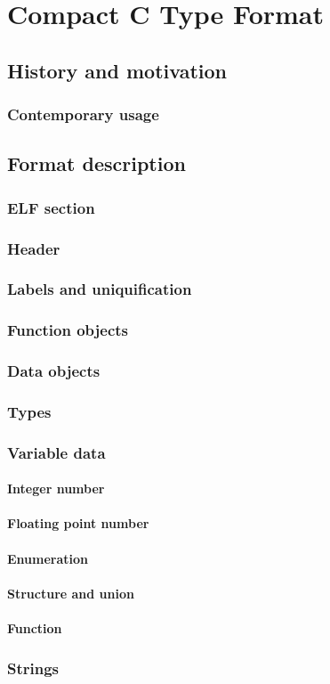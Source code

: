 \chapter{Compact C Type Format}

\section{History and motivation}
\subsection{Contemporary usage}
\section{Format description}
\subsection{ELF section}
\subsection{Header}
\subsection{Labels and uniquification}
\subsection{Function objects}
\subsection{Data objects}
\subsection{Types}
\subsection{Variable data}
\subsubsection{Integer number}
\subsubsection{Floating point number}
\subsubsection{Enumeration}
\subsubsection{Structure and union}
\subsubsection{Function}
\subsection{Strings}

